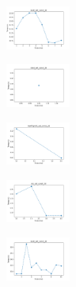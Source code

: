 \begin{figure}[H]
\begin{subfigure}
    \end{subfigure}
    \hfill
    \begin{subfigure}
        \centering
        \includegraphics[width=0.234\textwidth]{img/copkm/ecoli_set_const_20_589741062_time.png}
    \end{subfigure}
    \hfill
    \begin{subfigure}
        \centering
        \includegraphics[width=0.234\textwidth]{img/copkm/rand_set_const_20_589741062_time.png}
    \end{subfigure}
    \hfill
    \begin{subfigure}
        \centering
        \includegraphics[width=0.234\textwidth]{img/copkm/newthyroid_set_const_20_589741062_time.png}
    \end{subfigure}
    \hfill
    \begin{subfigure}
        \centering
        \includegraphics[width=0.234\textwidth]{img/copkm/iris_set_const_20_277451237_time.png}
    \end{subfigure}
    \hfill
    \begin{subfigure}
        \centering
        \includegraphics[width=0.234\textwidth]{img/copkm/ecoli_set_const_20_277451237_time.png}
    \end{subfigure}
    \hfill

\end{figure}
